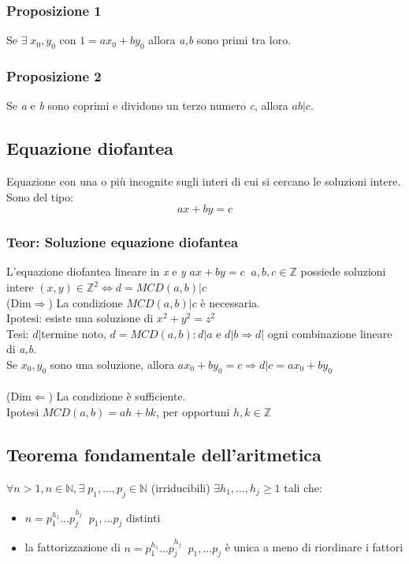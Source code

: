 \subsubsection{Proposizione 1}
Se \(\exists\; x_0,y_0\) con \(1=ax_0+by_0\) allora \textit{a,b} sono primi tra loro.

\subsubsection{Proposizione 2}
Se \textit{a} e \textit{b} sono coprimi e dividono un terzo numero \textit{c}, allora \(ab|c\).

\subsection{Equazione diofantea}
Equazione con una o più incognite sugli interi di cui si cercano le soluzioni intere. Sono del tipo:
\[ax+by=c\]

\subsubsection{Teor: Soluzione equazione diofantea}
L'equazione diofantea lineare in \textit{x} e \textit{y} \(ax+by=c\;\; a,b,c\in\mathbb{Z}\) possiede soluzioni intere \((x,y)\in\mathbb{Z}^2\Leftrightarrow d=MCD(a,b)|c\)
\\
(Dim\(\Rightarrow\)) La condizione \(MCD(a,b)|c\) è necessaria.
\\
Ipotesi: esiste una soluzione di \(x^2+y^2=z^2\)
\\
Tesi: \(d|\)termine noto, \(d=MCD(a,b): d|a\) e \(d|b\Rightarrow d|\) ogni combinazione lineare di \textit{a,b}.
\\
Se \(x_0,y_0\) sono una soluzione, allora \(ax_0+by_0=c\Rightarrow d|c=ax_0+by_0\)
\\\\
(Dim\(\Leftarrow\)) La condizione è sufficiente.
\\
Ipotesi \(MCD(a,b)=ah+bk\), per opportuni \(h,k\in\mathbb{Z}\)

\subsection{Teorema fondamentale dell'aritmetica}
\(\forall n>1, n\in\mathbb{N},\exists\;p_1,...,p_j\in\mathbb{N}\) (irriducibili) \(\exists h_1,...,h_j\geq 1\) tali che:
\begin{itemize}
    \item \(n=p_1^{h_1}...p_j^{h_j}\;\;p_1,...p_j\) distinti
    \item la fattorizzazione di \(n=p_1^{h_1}...p_j^{h_j}\;\;p_1,...p_j\) è unica a meno di riordinare i fattori
\end{itemize}

